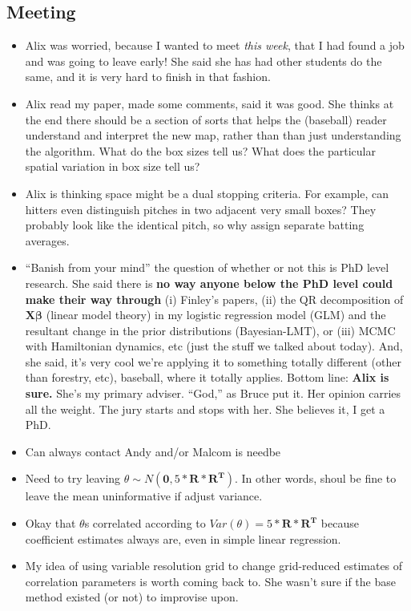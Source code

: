 \documentclass{article}
\begin{document}
\subsection*{Meeting}
\begin{itemize}
\item Alix was worried, because I wanted to meet {\it this week}, that I had found a job and was going to leave early! She said she has had other students do the same, and it is very hard to finish in that fashion.
\item Alix read my paper, made some comments, said it was good. She thinks at the end there should be a section of sorts that helps the (baseball) reader understand and interpret the new map, rather than than just understanding the algorithm. What do the box sizes tell us? What does the particular spatial variation in box size tell us? 
\item Alix is thinking space might be a dual stopping criteria. For example, can hitters even distinguish pitches in two adjacent very small boxes? They probably look like the identical pitch, so why assign separate batting averages.
\item ``Banish from your mind'' the question of whether or not this is PhD level research. She said there is {\bf no way anyone below the PhD level could make their way through} (i) Finley's papers, (ii) the  QR decomposition of $\pmb{X \beta}$ (linear model theory) in my logistic regression model (GLM) and the resultant change in the prior distributions (Bayesian-LMT), or (iii) MCMC with Hamiltonian dynamics, etc (just the stuff we talked about today). And, she said, it's very cool we're applying it to something totally different (other than forestry, etc), baseball, where it totally applies. Bottom line: {\bf Alix is sure.} She's my primary adviser. ``God,'' as Bruce put it. Her opinion carries all the weight. The jury starts and stops with her. She believes it, I get a PhD.
\item Can always contact Andy and/or Malcom is needbe
\item Need to try leaving $\theta \sim N(\pmb{0}, 5*\pmb{R*R^{T}})$. In other words, shoul be fine to leave the mean uninformative if adjust variance.
\item Okay that $\theta$s correlated according to $Var(\theta) = 5*\pmb{R*R^{T}}$ because coefficient estimates always are, even in simple linear regression.
\item My idea of using variable resolution grid to change grid-reduced estimates of correlation parameters is worth coming back to. She wasn't sure if the base method existed (or not) to improvise upon.
\end{itemize}
\end{document}
